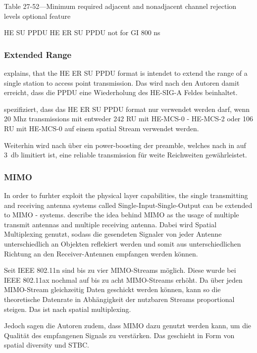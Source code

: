 Table 27-52—Minimum required adjacent and nonadjacent channel rejection levels
optional feature \cite{standardax}

HE SU PPDU HE ER SU PPDU not for GI 800 ns \cite{standardax}

\subsubsection*{Extended Range}

\textcite{Deng} explains, that the HE ER SU \ac{PPDU} format is intendet to extend the range of a single station to access point transmission. Das wird nach den Autoren damit erreicht, dass die PPDU eine Wiederholung des HE-SIG-A Feldes beinhaltet.

\cite{Standard} spezifiziert, dass das HE ER SU PPDU format nur verwendet werden  darf, wenn 20 Mhz transmissions mit entweder 242 RU mit HE-MCS-0 - HE-MCS-2 oder 106 RU mit HE-MCS-0 auf einem spatial Stream verwendet werden.

Weiterhin wird nach \cite{Deng} über ein power-boosting der preamble, welches nach in \cite{standard} auf \SI{3}{\decibel} limitiert ist,  eine reliable transmission für weite Reichweiten gewährleistet. 



\subsubsection*{\ac{MIMO}}
In order to furhter exploit the physical layer capabilities, the single transmitting and receiving antenna systems called Single-Input-Single-Output can be extended to \ac{MIMO} - systems.
\textcite{sauter} describe the idea behind \ac{MIMO} as the usage of multiple transmit antennas and multiple receiving antenna. Dabei wird Spatial Multiplexing genutzt, sodass die gesendeten Signaler von jeder Antenne unterschiedlich an Objekten reflekiert werden und somit aus unterschiedlichen Richtung an den Receiver-Antennen empfangen werden können. 

Seit IEEE 802.11n sind bis zu vier MIMO-Streams möglich. Diese wurde bei IEEE 802.11ax nochmal auf bis zu acht MIMO-Streams erhöht. Da über jeden MIMO-Stream gleichzeitig Daten geschickt werden können, kann so die theoretische Datenrate in Abhängigkeit der nutzbaren Streams proportional steigen. Das ist nach \textcite{abbas} spatial multiplexing.

Jedoch sagen die Autoren zudem, dass MIMO dazu genutzt werden kann, um die Qualität des empfangenen Signals zu verstärken.  Das geschieht in Form von spatial diversity und \ac{STBC}.

